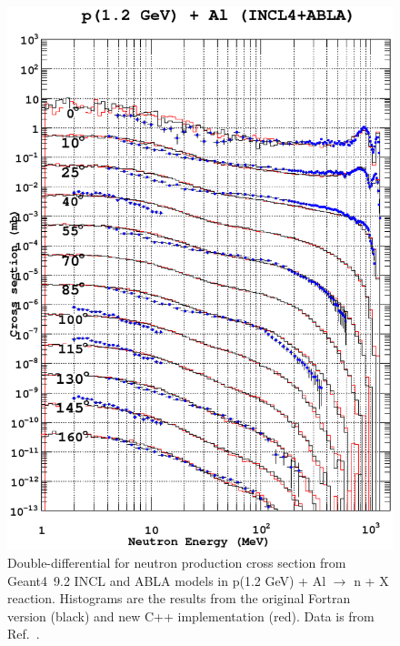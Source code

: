 \documentclass[a4paper]{jpconf}
\begin{document}
\begin{figure}
\begin{center}
\includegraphics[scale=0.70]{images/proton1200MeVAlv1.eps}
\caption{\label{fig:neutronAl}Double-differential for neutron production cross section
    from Geant4~9.2 INCL and ABLA models in p(1.2 GeV) + Al $\rightarrow$ n + X reaction.
Histograms are the results from the original Fortran version (black) and new C++ implementation (red). 
Data is from Ref.~\cite{data}.}

\end{center}

\end{figure}
\end{document}

